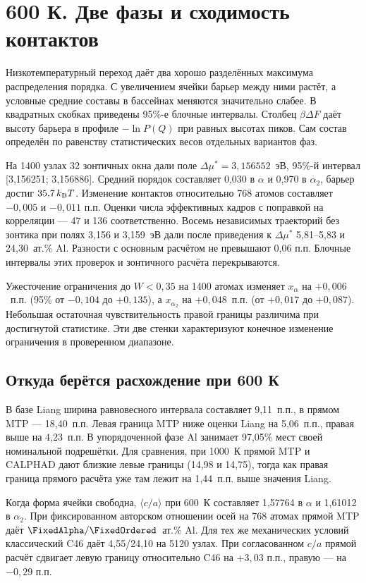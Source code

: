 \section*{600 К. Две фазы и сходимость контактов}
Низкотемпературный переход даёт два хорошо разделённых максимума
распределения порядка. С увеличением ячейки барьер между ними растёт,
а условные средние составы в бассейнах меняются значительно слабее.
В квадратных скобках приведены 95\%-е блочные интервалы.
Столбец \(\beta\Delta F\) даёт высоту барьера в профиле
\(-\ln P(Q)\) при равных высотах пиков. Сам состав определён по
равенству статистических весов отдельных вариантов фаз.


На 1400 узлах 32 зонтичных окна дали поле
\(\Delta\mu^*=3{,}156552\)~эВ, 95\%-й интервал [3,156251; 3,156886].
Средний порядок составляет 0,030 в \(\alpha\) и 0,970 в \(\alpha_2\),
барьер достиг \(35{,}7\,k_{\rm B}T\). Изменение контактов относительно
768 атомов составляет \(-0{,}005\) и \(-0{,}011\) п.п. Оценки числа
эффективных кадров с поправкой на корреляции --- 47 и 136 соответственно.
Восемь независимых траекторий без зонтика при полях 3,156 и 3,159~эВ
дали после приведения к \(\Delta\mu^*\) 5,81--5,83 и 24,30~ат.\% Al.
Разности с основным расчётом не превышают 0,06 п.п. Блочные интервалы
этих проверок и зонтичного расчёта перекрываются.

Ужесточение ограничения до \(W<0{,}35\) на 1400 атомах изменяет
\(x_\alpha\) на \(+0{,}006\)~п.п. (95\% от \(-0{,}104\) до \(+0{,}135\)),
а \(x_{\alpha_2}\) на \(+0{,}048\)~п.п. (от \(+0{,}017\) до \(+0{,}087\)).
Небольшая остаточная чувствительность правой границы различима
при достигнутой статистике. Эти две стенки характеризуют конечное
изменение ограничения в проверенном диапазоне.

\subsection*{Откуда берётся расхождение при 600 К}
В базе Liang ширина равновесного интервала составляет 9,11~п.п.,
в прямом MTP --- 18,40~п.п. Левая граница MTP ниже оценки Liang на 5,06~п.п.,
правая выше на 4,23~п.п. В упорядоченной фазе Al занимает 97,05\% мест
своей номинальной подрешётки. Для сравнения, при
1000~К прямой MTP и CALPHAD дают близкие левые границы
(14,98 и 14,75), тогда как правая граница прямого расчёта уже там
лежит на 1,44~п.п. выше значения Liang.

Когда форма ячейки свободна, \(\langle c/a\rangle\) при 600~К составляет
1,57764 в \(\alpha\) и 1,61012 в \(\alpha_2\). При фиксированном
авторском отношении осей на 768 атомах прямой MTP даёт
\(\FixedAlpha/\FixedOrdered\)~ат.\% Al. Для тех же механических условий
классический C46 даёт 4,55/24,10 на 5120 узлах. При согласованном
\(c/a\) прямой расчёт сдвигает левую границу относительно C46 на
\(+3{,}03\) п.п., правую --- на \(-0{,}29\) п.п.

